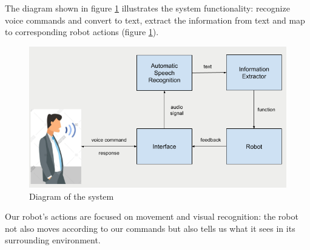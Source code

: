The diagram shown in figure \ref{fig:diagramSystem} illustrates the system functionality: recognize voice commands and convert to text, extract the information from text and map to corresponding robot actions (figure \ref{fig:diagramSystem}). 
\begin{figure}[tb]
\centering
\includegraphics[width = 0.7\hsize]{./figures/diagramSystem}
\caption{Diagram of the system}
\label{fig:diagramSystem}
\end{figure}

Our robot's actions are focused on movement and visual recognition: the robot not also moves according to our commands but also tells us what it sees in its surrounding environment.  

